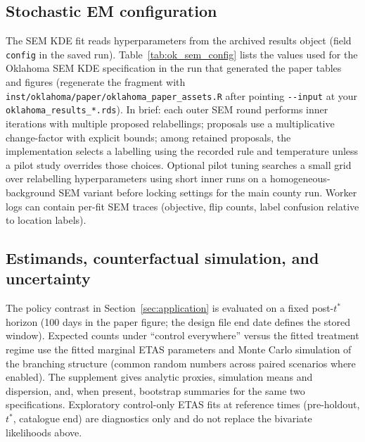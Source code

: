 \documentclass{statsoc}
\newcommand{\1}{\mathbbm{1}}
\begin{document}
\subsection{Stochastic EM configuration}\label{sec:ok_sem_config}
The SEM KDE fit reads hyperparameters from the archived results object (field \verb|config| in the saved run). Table~\ref{tab:ok_sem_config} lists the values used for the Oklahoma SEM KDE specification in the run that generated the paper tables and figures (regenerate the fragment with \verb|inst/oklahoma/paper/oklahoma_paper_assets.R| after pointing \verb|--input| at your \verb|oklahoma_results_*.rds|). In brief: each outer SEM round performs inner iterations with multiple proposed relabellings; proposals use a multiplicative change-factor with explicit bounds; among retained proposals, the implementation selects a labelling using the recorded rule and temperature unless a pilot study overrides those choices. Optional pilot tuning searches a small grid over relabelling hyperparameters using short inner runs on a homogeneous-background SEM variant before locking settings for the main county run. Worker logs can contain per-fit SEM traces (objective, flip counts, label confusion relative to location labels).



\subsection{Estimands, counterfactual simulation, and uncertainty}\label{sec:ok_estimands}
The policy contrast in Section~\ref{sec:application} is evaluated on a fixed post-$t^\ast$ horizon (100 days in the paper figure; the design file end date defines the stored window). Expected counts under ``control everywhere'' versus the fitted treatment regime use the fitted marginal ETAS parameters and Monte Carlo simulation of the branching structure (common random numbers across paired scenarios where enabled). The supplement gives analytic proxies, simulation means and dispersion, and, when present, bootstrap summaries for the same two specifications. Exploratory control-only ETAS fits at reference times (pre-holdout, $t^\ast$, catalogue end) are diagnostics only and do not replace the bivariate likelihoods above.
\end{document}
